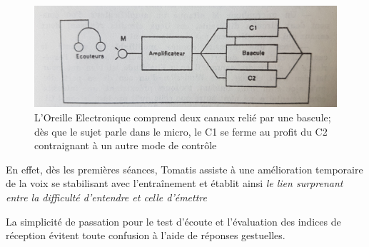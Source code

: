 \begin{figure}
	\centering
	\includegraphics[width=0.7\linewidth]{images/oreilleelectro.jpg}
	\caption[ oreilleelectro]{L'Oreille Electronique
          comprend deux canaux relié par une bascule; dès que le
          sujet parle dans le micro, le C1 se ferme au profit du C2
          contraignant à un autre mode de contrôle}
       
	\label{oreilleelectro}
      \end{figure}



 En effet, dès les premières
séances, Tomatis  assiste à une amélioration temporaire de la voix se
stabilisant avec l'entraînement et établit ainsi
\textit{le lien surprenant entre la difficulté d'entendre et celle d'émettre}

La simplicité de
passation pour le test d'écoute et 
 l'évaluation des indices de réception évitent toute confusion
à l'aide de réponses gestuelles.


